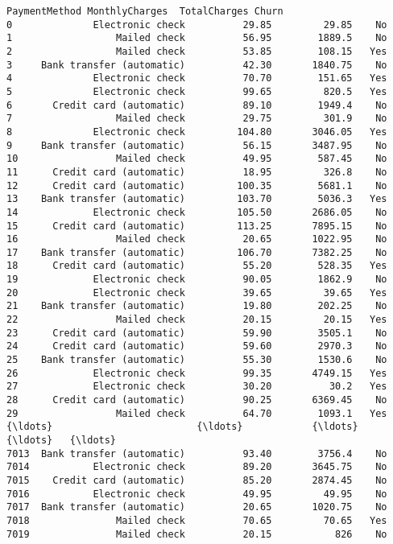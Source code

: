 \documentclass[11pt]{article}
\begin{document}
\begin{tcolorbox}[breakable, boxrule=.5pt, size=fbox, pad at break*=1mm, opacityfill=0]
\begin{Verbatim}[commandchars=\\\{\}]
                  PaymentMethod MonthlyCharges  TotalCharges Churn
0              Electronic check          29.85         29.85    No
1                  Mailed check          56.95        1889.5    No
2                  Mailed check          53.85        108.15   Yes
3     Bank transfer (automatic)          42.30       1840.75    No
4              Electronic check          70.70        151.65   Yes
5              Electronic check          99.65         820.5   Yes
6       Credit card (automatic)          89.10        1949.4    No
7                  Mailed check          29.75         301.9    No
8              Electronic check         104.80       3046.05   Yes
9     Bank transfer (automatic)          56.15       3487.95    No
10                 Mailed check          49.95        587.45    No
11      Credit card (automatic)          18.95         326.8    No
12      Credit card (automatic)         100.35        5681.1    No
13    Bank transfer (automatic)         103.70        5036.3   Yes
14             Electronic check         105.50       2686.05    No
15      Credit card (automatic)         113.25       7895.15    No
16                 Mailed check          20.65       1022.95    No
17    Bank transfer (automatic)         106.70       7382.25    No
18      Credit card (automatic)          55.20        528.35   Yes
19             Electronic check          90.05        1862.9    No
20             Electronic check          39.65         39.65   Yes
21    Bank transfer (automatic)          19.80        202.25    No
22                 Mailed check          20.15         20.15   Yes
23      Credit card (automatic)          59.90        3505.1    No
24      Credit card (automatic)          59.60        2970.3    No
25    Bank transfer (automatic)          55.30        1530.6    No
26             Electronic check          99.35       4749.15   Yes
27             Electronic check          30.20          30.2   Yes
28      Credit card (automatic)          90.25       6369.45    No
29                 Mailed check          64.70        1093.1   Yes
{\ldots}                         {\ldots}            {\ldots}           {\ldots}   {\ldots}
7013  Bank transfer (automatic)          93.40        3756.4    No
7014           Electronic check          89.20       3645.75    No
7015    Credit card (automatic)          85.20       2874.45    No
7016           Electronic check          49.95         49.95    No
7017  Bank transfer (automatic)          20.65       1020.75    No
7018               Mailed check          70.65         70.65   Yes
7019               Mailed check          20.15           826    No

\end{Verbatim}
\end{tcolorbox}
\end{document}
